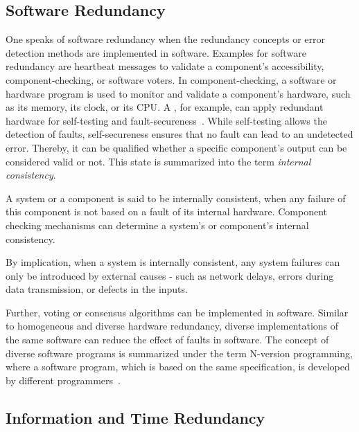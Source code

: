 \subsection{Software Redundancy}
One speaks of software redundancy when the redundancy concepts or error detection methods are implemented in software.
Examples for software redundancy are heartbeat messages to validate a component's accessibility, component-checking, or software voters.
In component-checking, a software or hardware program is used to monitor and validate a component's hardware, such as its memory, its clock, or its \gls*{CPU}.
A , for example, can apply redundant hardware for self-testing and fault-secureness~\cite{SelfCheckingProcessorDesign}.
While self-testing allows the detection of faults, self-secureness ensures that no fault can lead to an undetected error.
Thereby, it can be qualified whether a specific component's output can be considered valid or not.
This state is summarized into the term \textit{internal consistency}.

\begin{definition}
A system or a component is said to be internally consistent, when any failure of this component is not based on a fault of its internal hardware.
Component checking mechanisms can determine a system's or component's internal consistency.
\end{definition}

By implication, when a system is internally consistent, any system failures can only be introduced by external causes - such as network delays, errors during data transmission, or defects in the inputs.

Further, voting or consensus algorithms can be implemented in software.
Similar to homogeneous and diverse hardware redundancy, diverse implementations of the same software can reduce the effect of faults in software.
The concept of diverse software programs is summarized under the term N-version programming, where a software program, which is based on the same specification, is developed by different programmers~\cite{BarryFaultToleranceAnalysis}.

\subsection{Information and Time Redundancy}

